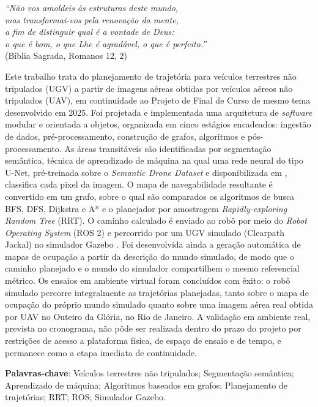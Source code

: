 \documentclass[
    12pt,
    openright,
    oneside,
    a4paper,
    english,
    brazil
]{abntex2}
\begin{document}
\begin{epigrafe}
    \vspace*{\fill}
    \begin{flushright}
        \textit{``Não vos amoldeis às estruturas deste mundo,\\
        mas transformai-vos pela renovação da mente,\\
        a fim de distinguir qual é a vontade de Deus:\\
        o que é bom, o que Lhe é agradável, o que é perfeito.''}\\
        (Bíblia Sagrada, Romanos 12, 2)
    \end{flushright}
\end{epigrafe}

\setlength{\absparsep}{18pt}
\begin{resumo}
Este trabalho trata do planejamento de trajetória para veículos terrestres não tripulados (UGV) a partir de imagens aéreas obtidas por veículos aéreos não tripulados (UAV), em continuidade ao Projeto de Final de Curso de mesmo tema desenvolvido em 2025. Foi projetada e implementada uma arquitetura de \textit{software} modular e orientada a objetos, organizada em cinco estágios encadeados: ingestão de dados, pré-processamento, construção de grafos, algoritmos e pós-processamento. As áreas transitáveis são identificadas por segmentação semântica, técnica de aprendizado de máquina na qual uma rede neural do tipo U-Net, pré-treinada sobre o \textit{Semantic Drone Dataset} \cite{drone_dataset} e disponibilizada em \cite{junior2024_models}, classifica cada pixel da imagem. O mapa de navegabilidade resultante é convertido em um grafo, sobre o qual são comparados os algoritmos de busca BFS, DFS, Dijkstra e A* e o planejador por amostragem \textit{Rapidly-exploring Random Tree} (RRT). O caminho calculado é enviado ao robô por meio do \textit{Robot Operating System} (ROS 2) \cite{quigley2009} e percorrido por um UGV simulado (Clearpath Jackal) no simulador Gazebo \cite{koenig2004}. Foi desenvolvida ainda a geração automática de mapas de ocupação a partir da descrição do mundo simulado, de modo que o caminho planejado e o mundo do simulador compartilhem o mesmo referencial métrico. Os ensaios em ambiente virtual foram concluídos com êxito: o robô simulado percorre integralmente as trajetórias planejadas, tanto sobre o mapa de ocupação do próprio mundo simulado quanto sobre uma imagem aérea real obtida por UAV no Outeiro da Glória, no Rio de Janeiro. A validação em ambiente real, prevista no cronograma, não pôde ser realizada dentro do prazo do projeto por restrições de acesso a plataforma física, de espaço de ensaio e de tempo, e permanece como a etapa imediata de continuidade.

\textbf{Palavras-chave}: Veículos terrestres não tripulados; Segmentação semântica; Aprendizado de máquina; Algoritmos baseados em grafos; Planejamento de trajetórias; RRT; ROS; Simulador Gazebo.
\end{resumo}
\end{document}
